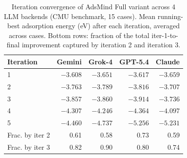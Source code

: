 \documentclass[%
 preprint,
 superscriptaddress,
 amsmath,amssymb,
 aps,
 prb,
 floatfix,
]{revtex4-2}
\begin{document}
\begin{table}[ht]
\centering
\caption{Iteration convergence of AdsMind Full variant across 4 LLM backends (CMU benchmark, 15 cases). Mean running-best adsorption energy (eV) after each iteration, averaged across cases. Bottom rows: fraction of the total iter-1-to-final improvement captured by iteration 2 and iteration 3.}
\label{tab:si-iteration-convergence}
\begin{tabular}{lrrrr}
\toprule
Iteration & Gemini & Grok-4 & GPT-5.4 & Claude \\
\midrule
  1 & $-3.608$ & $-3.651$ & $-3.617$ & $-3.659$ \\
  2 & $-3.763$ & $-3.789$ & $-3.816$ & $-3.707$ \\
  3 & $-3.857$ & $-3.860$ & $-3.914$ & $-3.736$ \\
  4 & $-4.307$ & $-4.246$ & $-4.364$ & $-4.097$ \\
  5 & $-4.460$ & $-4.737$ & $-5.256$ & $-5.231$ \\
\midrule
  Frac. by iter 2 & 0.61 & 0.58 & 0.73 & 0.59 \\
  Frac. by iter 3 & 0.82 & 0.90 & 0.80 & 0.74 \\
\bottomrule
\end{tabular}
\end{table}







\end{document}
